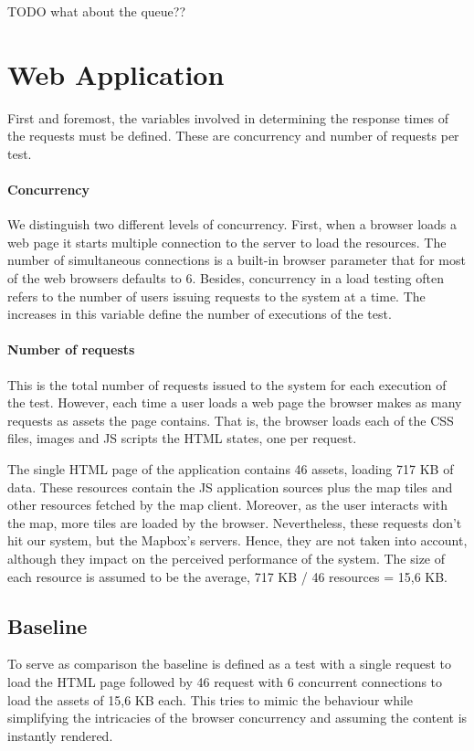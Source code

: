 TODO what about the queue??

\section{Web Application}

First and foremost, the variables involved in determining the response times of the requests must be defined. These are concurrency and number of requests per test.

\paragraph{Concurrency} We distinguish two different levels of concurrency. First, when a browser loads a web page it starts multiple connection to the server to load the resources. The number of simultaneous connections is a built-in browser parameter that for most of the web browsers defaults to 6. Besides, concurrency in a load testing often refers to the number of users issuing requests to the system at a time. The increases in this variable define the number of executions of the test.

\paragraph{Number of requests} This is the total number of requests issued to the system for each execution of the test. However, each time a user loads a web page the browser makes as many requests as assets the page contains. That is, the browser loads each of the CSS files, images and JS scripts the HTML states, one per request.

The single HTML page of the application contains 46 assets, loading 717 KB of data. These resources contain the JS application sources plus the map tiles and other resources fetched by the map client. Moreover, as the user interacts with the map, more tiles are loaded by the browser. Nevertheless, these requests don't hit our system, but the Mapbox's servers. Hence, they are not taken into account, although they impact on the perceived performance of the system. The size of each resource is assumed to be the average, 717 KB / 46 resources = 15,6 KB.

\subsection*{Baseline}

To serve as comparison the baseline is defined as a test with a single request to load the HTML page followed by 46 request with 6 concurrent connections to load the assets of 15,6 KB each. This tries to mimic the behaviour while simplifying the intricacies of the browser concurrency and assuming the content is instantly rendered.

